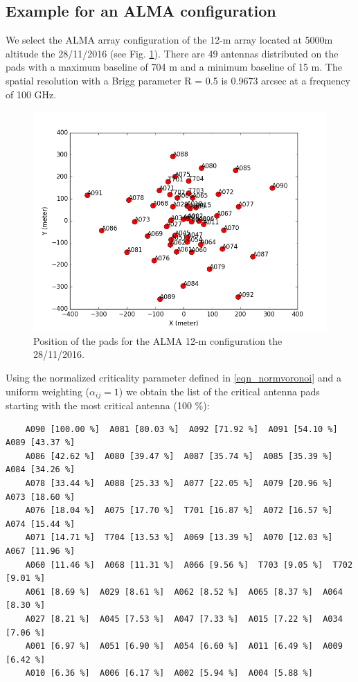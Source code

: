 \documentclass{aa}
\begin{document}
\begin{appendix}
\subsection{Example for an ALMA configuration}

We select the ALMA array configuration of the 12-m array located at 5000m altitude the 28/11/2016 (see Fig. \ref{fig_pospads}). There are 49 antennas distributed 
on the pads with a maximum baseline of 704 m and a minimum baseline of 15 m. The spatial resolution with a Brigg  parameter R = 0.5 is 0.9673 arcsec at a frequency of 
100 GHz. 


\begin{figure}
 \includegraphics[width=15cm]{posPads.png}
 \caption{Position of the pads for the ALMA 12-m configuration the 28/11/2016.}
 \label{fig_pospads}
\end{figure}

Using the normalized criticality parameter defined in \ref{eqn_normvoronoi} and a uniform weighting ($\alpha_{ij} = 1$)  we obtain the list of the critical antenna pads starting with the most
critical antenna (100 \%):

\begin{verbatim}
    A090 [100.00 %]  A081 [80.03 %]  A092 [71.92 %]  A091 [54.10 %]  A089 [43.37 %]  
    A086 [42.62 %]  A080 [39.47 %]  A087 [35.74 %]  A085 [35.39 %]  A084 [34.26 %]  
    A078 [33.44 %]  A088 [25.33 %]  A077 [22.05 %]  A079 [20.96 %]  A073 [18.60 %]  
    A076 [18.04 %]  A075 [17.70 %]  T701 [16.87 %]  A072 [16.57 %]  A074 [15.44 %]  
    A071 [14.71 %]  T704 [13.53 %]  A069 [13.39 %]  A070 [12.03 %]  A067 [11.96 %]  
    A060 [11.46 %]  A068 [11.31 %]  A066 [9.56 %]  T703 [9.05 %]  T702 [9.01 %]  
    A061 [8.69 %]  A029 [8.61 %]  A062 [8.52 %]  A065 [8.37 %]  A064 [8.30 %]  
    A027 [8.21 %]  A045 [7.53 %]  A047 [7.33 %]  A015 [7.22 %]  A034 [7.06 %]  
    A001 [6.97 %]  A051 [6.90 %]  A054 [6.60 %]  A011 [6.49 %]  A009 [6.42 %]  
    A010 [6.36 %]  A006 [6.17 %]  A002 [5.94 %]  A004 [5.88 %]  


\end{verbatim}
\end{appendix}
\end{document}
